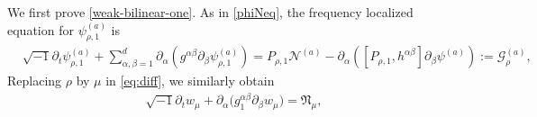 \documentclass[11pt,letterpaper,reqno]{amsart}
\numberwithin{equation}{section}
\theoremstyle{definition}
\theoremstyle{remark}
\newcommand{\pa}{\partial}
\begin{document}
We first prove \eqref{weak-bilinear-one}. As in \eqref{phiNeq}, the
frequency localized equation for \(\psi_{\rho,1}^{(a)}\) is
\begin{align*} 
	&\sqrt{-1} \pa_t \psi^{(a)}_{\rho,1} +\sum_{\alpha,\beta=1}^d \partial_{\alpha} (g^{\alpha \beta} \partial_{ \beta}  \psi^{(a)}_{\rho,1} )=P_{\rho,1} \mathcal{N}^{(a)}- \partial_{\alpha}  ( [P_{\rho,1}, h^{\alpha \beta} ]  \partial_\beta  \psi^{(a)} ):= \mathcal {G}^{(a)}_\rho,	 
\end{align*}
Replacing \(\rho\) by \(\mu\) in \eqref{eq:diff}, we similarly obtain
 \begin{align*} 
	  \sqrt{-1}\partial_t w_{\mu}
+\partial_\alpha\big(g^{\alpha\beta}_{1 }\partial_\beta w_{\mu}\big)
 = \mathfrak{N}_\mu,
\end{align*}
\end{document}
